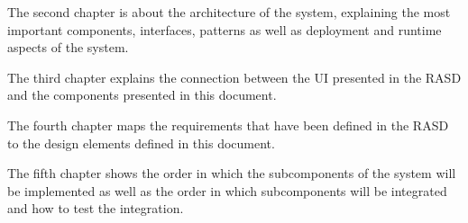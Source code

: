 The second chapter is about the architecture of the system, explaining the most important components, interfaces, patterns as well as deployment and runtime aspects of the system.

The third chapter explains the connection between the UI presented in the RASD and the components presented in this document.

The fourth chapter maps the requirements that have been defined in the RASD to the design elements defined in this document.

The fifth chapter shows the order in which the subcomponents of the system will be implemented as well as the order in which subcomponents will be integrated and how to test the integration. 